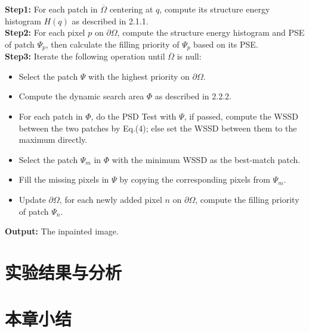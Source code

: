  \textbf{Step1:} For each patch in \(\overline{\Omega}\) centering at \(q\), compute its structure energy histogram \(H(q)\) as described in 2.1.1.\\
 \textbf{Step2:} For each pixel \(p\) on \(\partial \Omega\), compute the structure energy histogram and PSE of patch \(\Psi_p\), then calculate the filling priority of \(\Psi_p\) based on its PSE.\\
 \textbf{Step3:} Iterate the following operation until \(\overline{\Omega}\) is null:
 \begin{itemize}
     \item Select the patch \(\Psi\) with the highest priority on \(\partial \Omega\).
     \item Compute the dynamic search area \(\Phi\) as described in 2.2.2.
     \item For each patch in \(\Phi\), do the PSD Test with \(\Psi\), if passed, compute the WSSD between the two patches by Eq.(4); else set the WSSD between them to the maximum directly.
     \item Select the patch \(\Psi_m \) in \(\Phi\) with the minimum WSSD as the best-match patch.
     \item Fill the missing pixels in \(\Psi\) by copying the corresponding pixels from \(\Psi_m\).
     \item Update \(\partial \Omega\), for each newly added pixel \(n\) on \(\partial \Omega\), compute the filling priority of patch \(\Psi_n\).
   \end{itemize}
 \textbf{Output:} The inpainted image.


 \section{实验结果与分析}
 \label{results}


 \section{本章小结}
 \label{conclusions}
